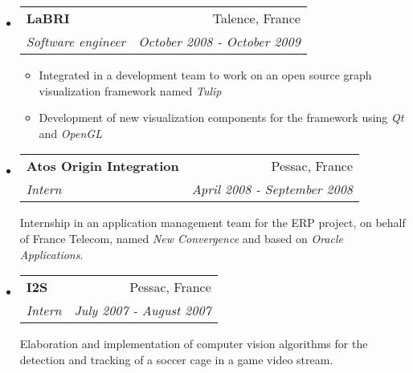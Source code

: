 \documentclass[letterpaper,11pt]{article}
\makeatletter
\newcommand{\resitem}[1]{\item #1 \vspace{-2pt}}
\newcommand{\ressubheading}[4]{
\begin{tabular*}{6.5in}{l@{\cftdotfill{\cftsecdotsep}\extracolsep{\fill}}r}
    \textbf{#1} & #2 \\
    \textit{#3} & \textit{#4} \\
\end{tabular*}\vspace{-6pt}}
\makeatother
\begin{document}
\begin{itemize}
  \item
    \ressubheading{LaBRI}{Talence, France}{Software engineer}{October 2008 - October 2009}
    \begin{itemize}
      \resitem{Integrated in a development team to work on an open source graph visualization framework named \emph{Tulip}}
      \resitem{Development of new visualization components for the framework using \emph{Qt} and \emph{OpenGL}}
    \end{itemize}

  \item
    \ressubheading{Atos Origin Integration}{Pessac, France}{Intern}{April 2008 - September 2008}

    Internship in an application management team for the ERP project, on behalf of France Telecom, named \emph{New Convergence} and based on 
    \emph{Oracle Applications}.
    
  \item
    \ressubheading{I2S}{Pessac, France}{Intern}{July 2007 - August 2007}

    Elaboration and implementation of computer vision algorithms for the detection and tracking of a soccer cage in a game video stream.

\end{itemize}
\end{document}
